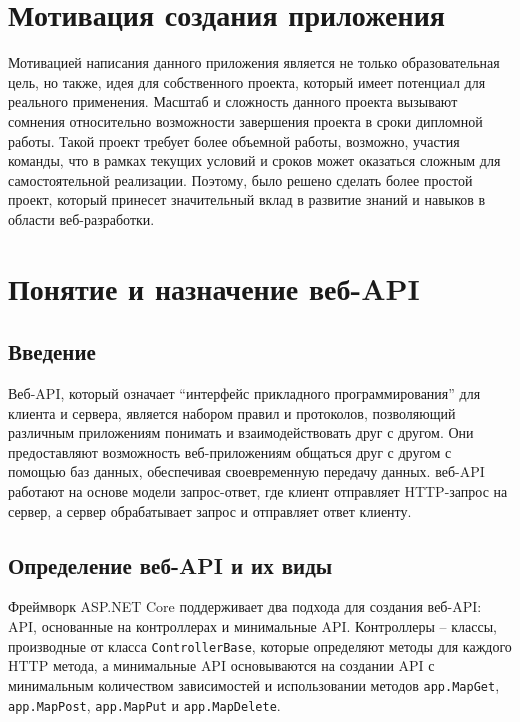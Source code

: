 \documentclass[a4paper,12pt]{report}
\begin{document}
\section{Мотивация создания приложения}

Мотивацией написания данного приложения является не только образовательная цель, но также, идея для собственного проекта, который
имеет потенциал для реального применения. Масштаб и сложность данного проекта вызывают сомнения относительно возможности завершения проекта в сроки 
дипломной работы. Такой проект требует более объемной работы, возможно, участия команды, что в рамках текущих условий и сроков может оказаться 
сложным для самостоятельной реализации. Поэтому, было решено сделать более простой проект, который принесет значительный вклад в развитие знаний и навыков 
в области веб-разработки.

\section{Понятие и назначение веб-\acs{API}}

\subsection{Введение}

Веб-\acs{API}, который означает “интерфейс прикладного программирования” для клиента и сервера, 
является набором правил и протоколов, позволяющий различным приложениям понимать и взаимодействовать 
друг с другом. Они предоставляют возможность веб-приложениям общаться друг с другом с помощью баз данных, 
обеспечивая своевременную передачу данных. веб-\acs{API} работают на основе модели запрос-ответ, где клиент 
отправляет \acs{HTTP}-запрос  на сервер, а сервер обрабатывает запрос и отправляет ответ клиенту.

\subsection{Определение веб-\acs{API} и их виды}

Фреймворк ASP.NET Core поддерживает два подхода для создания веб-\acs{API}: \acs{API}, основанные на контроллерах 
и минимальные \acs{API}. Контроллеры -- классы, производные от класса \texttt{ControllerBase}, которые определяют методы 
для каждого \acs{HTTP} метода, а минимальные \acs{API} основываются на создании \acs{API} с минимальным количеством 
зависимостей и использовании методов \texttt{app.MapGet}, \texttt{app.MapPost}, \texttt{app.MapPut} и \texttt{app.MapDelete}.\cite{controller_vs_minimal_api}
\end{document}
